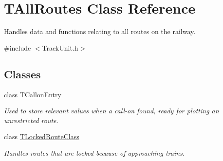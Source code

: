 \hypertarget{class_t_all_routes}{}\section{T\+All\+Routes Class Reference}
\label{class_t_all_routes}


Handles data and functions relating to all routes on the railway.  




{\ttfamily \#include $<$Track\+Unit.\+h$>$}

\subsection*{Classes}
\begin{DoxyCompactItemize}
\item 
class \mbox{\hyperlink{class_t_all_routes_1_1_t_callon_entry}{T\+Callon\+Entry}}
\begin{DoxyCompactList}\small\item\em Used to store relevant values when a call-\/on found, ready for plotting an unrestricted route. \end{DoxyCompactList}\item 
class \mbox{\hyperlink{class_t_all_routes_1_1_t_locked_route_class}{T\+Locked\+Route\+Class}}
\begin{DoxyCompactList}\small\item\em Handles routes that are locked because of approaching trains. \end{DoxyCompactList}\end{DoxyCompactItemize}
